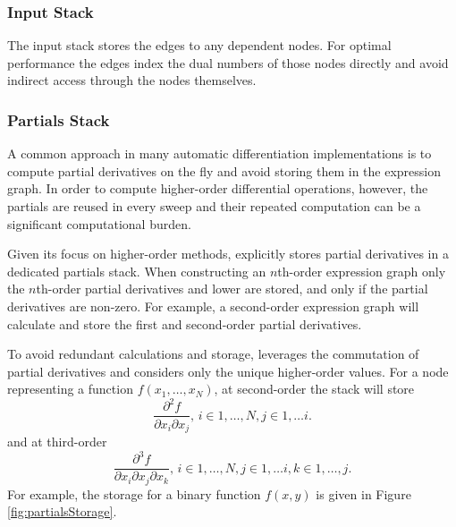 \subsubsection{Input Stack}

The input stack stores the edges to any dependent nodes.  For
optimal performance the edges index the dual numbers of those
nodes directly and avoid indirect access through the nodes
themselves.

\subsubsection{Partials Stack}

A common approach in many automatic differentiation implementations
is to compute partial derivatives on the fly and avoid storing them in
the expression graph.  In order to compute higher-order differential operations,
however, the partials are reused in every sweep and their repeated computation
can be a significant computational burden.

Given its focus on higher-order methods, \nomad explicitly stores partial 
derivatives in a dedicated partials stack.  When constructing an $n$th-order
expression graph only the $n$th-order partial derivatives and lower are
stored, and only if the partial derivatives are non-zero.  For example, 
a second-order expression graph will calculate and store the first and
second-order partial derivatives.

To avoid redundant calculations and storage, \nomad leverages the commutation
of partial derivatives and considers only the unique higher-order values.  
For a node representing a function $f \! \left( x_{1}, \ldots, x_{N} \right)$, 
at second-order the stack will store
%
\begin{equation*}
\frac{ \partial^{2} f }{ \partial x_{i} \partial x_{j} }, \, i \in 1, \ldots, N, j \in 1, \ldots i.
\end{equation*}
%
and at third-order
%
\begin{equation*}
\frac{ \partial^{3} f }{ \partial x_{i} \partial x_{j} \partial x_{k} }, \, 
i \in 1, \ldots, N, j \in 1, \ldots i, k \in 1, \ldots, j.
\end{equation*}
%
For example, the storage for a binary function $f \! \left(x, y \right)$
is given in Figure \ref{fig:partialsStorage}.

